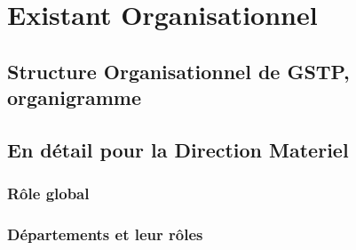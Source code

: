 \section{Existant Organisationnel}
    \subsection{Structure Organisationnel de GSTP, organigramme}
    \subsection{En détail pour la Direction Materiel}
        \subsubsection{Rôle global}
        \subsubsection{Départements et leur rôles}


        

